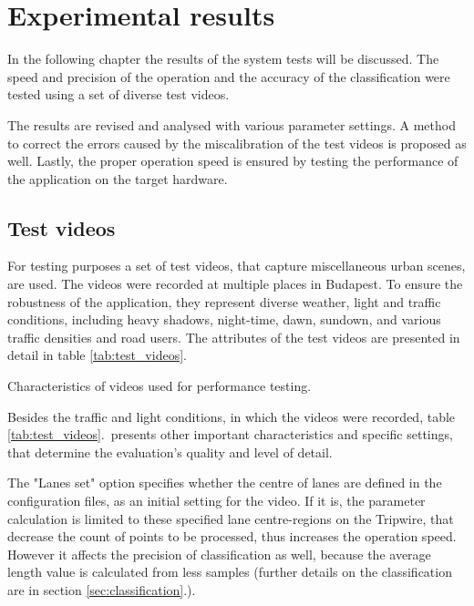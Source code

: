 \chapter{Experimental results}\label{chap:Tests}
In the following chapter the results of the system tests will be discussed. 
The speed and precision of the operation and the accuracy of the classification were tested using a set of diverse test videos.

The results are revised and analysed with various parameter settings.
A method to correct the errors caused by the miscalibration of the test videos is proposed as well.
Lastly, the proper operation speed is ensured by testing the performance of the application on the target hardware.

\section{Test videos}\label{sec:test_videos}
For testing purposes a set of test videos, that capture miscellaneous urban scenes, are used.
The videos were recorded at multiple places in Budapest.
To ensure the robustness of the application, they represent diverse weather, light and traffic conditions, including heavy shadows, night-time, dawn, sundown, and various traffic densities and road users.
The attributes of the test videos are presented in detail in table \ref{tab:test_videos}.

\begin{table}[!h]
	\begin{adjustbox}{center}
	\end{adjustbox}
	\caption{Characteristics of videos used for performance testing.}
	\label{tab:test_videos}
\end{table}

Besides the traffic and light conditions, in which the videos were recorded, table \ref{tab:test_videos}.~presents other important characteristics and specific settings, that determine the evaluation's quality and level of detail.

The "Lanes set" option specifies whether the centre of lanes are defined in the configuration files, as an initial setting for the video.
If it is, the parameter calculation is limited to these specified lane centre-regions on the Tripwire, that decrease the count of points to be processed, thus increases the operation speed.
However it affects the precision of classification as well, because the average length value is calculated from less samples (further details on the classification are in section \ref{sec:classification}.).

